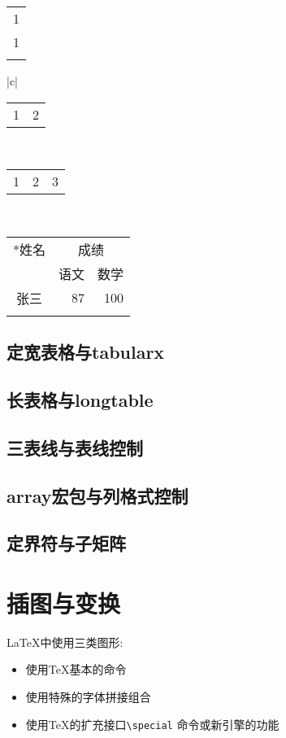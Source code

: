 \documentclass[a4paper, titlepage, hyperref, UTF8]{ctexart}
\begin{document}
\begin{tabular}{|c|}
\firsthline
1 \\ \hline
1 \vline 2 \\ \hline
1 \vline 2 \vline 3 \\
\lasthline
\end{tabular}

\begin{tabular}{|c|}
 \\ \hline
\begin{tabular}{c|c} 1 & 2 \end{tabular} \\ \hline
\begin{tabular}{@{}c|c|c@{}} 1 & 2 & 3 \end{tabular} \\ 
\lasthline
\end{tabular}

\begin{tabular}{|c|r|r|}
\firsthline
\multirow{2}*{姓名} & \multicolumn{2}{c|}{成绩} \\ \cline{2-3}
& 语文 & 数学 \\ \hline
张三 & 87 & 100 \\ 
\lasthline
\end{tabular}



\subsection{定宽表格与tabularx}
\subsection{长表格与longtable}
\subsection{三表线与表线控制}
\subsection{array宏包与列格式控制}
\subsection{定界符与子矩阵}

\section{插图与变换}
\LaTeX 中使用三类图形:
\begin{itemize}
\item 使用\TeX 基本的命令  
\item 使用特殊的字体拼接组合
\item 使用\TeX 的扩充接口\verb"\special" 命令或新引擎的功能
\end{itemize}
\end{document}
